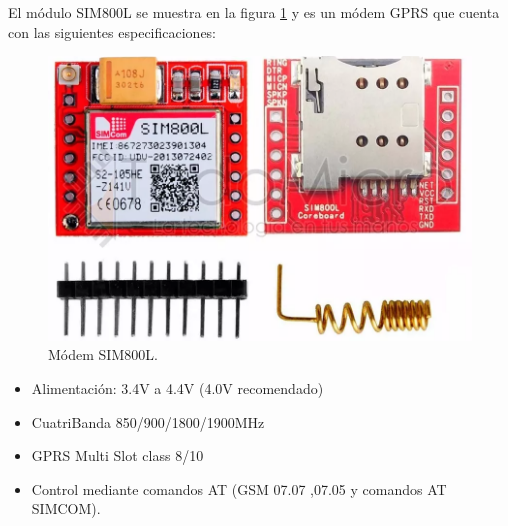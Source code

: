 El módulo SIM800L se muestra en la figura \ref{fig:sim800l} y es un módem GPRS que cuenta con las siguientes especificaciones:

\begin{figure}[!htb]
  \centering
  \includegraphics[scale=0.2]{./Figures/sim800.png}
  \caption{Módem SIM800L.}
  \label{fig:sim800l}
\end{figure}

\begin{itemize}
  \item Alimentación: 3.4V a 4.4V (4.0V recomendado)
  \item  CuatriBanda 850/900/1800/1900MHz
  \item  GPRS Multi Slot class 8/10
  \item  Control mediante comandos AT (GSM 07.07 ,07.05 y comandos AT SIMCOM).
\end{itemize}


